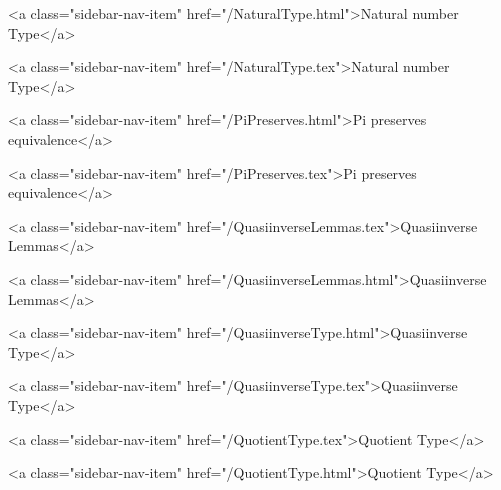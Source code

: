       
    
      
        
      
    
      
        
          <a class="sidebar-nav-item" href="/NaturalType.html">Natural number Type</a>
        
      
    
      
        
          <a class="sidebar-nav-item" href="/NaturalType.tex">Natural number Type</a>
        
      
    
      
        
          <a class="sidebar-nav-item" href="/PiPreserves.html">Pi preserves equivalence</a>
        
      
    
      
        
          <a class="sidebar-nav-item" href="/PiPreserves.tex">Pi preserves equivalence</a>
        
      
    
      
        
          <a class="sidebar-nav-item" href="/QuasiinverseLemmas.tex">Quasiinverse Lemmas</a>
        
      
    
      
        
          <a class="sidebar-nav-item" href="/QuasiinverseLemmas.html">Quasiinverse Lemmas</a>
        
      
    
      
        
          <a class="sidebar-nav-item" href="/QuasiinverseType.html">Quasiinverse Type</a>
        
      
    
      
        
          <a class="sidebar-nav-item" href="/QuasiinverseType.tex">Quasiinverse Type</a>
        
      
    
      
        
          <a class="sidebar-nav-item" href="/QuotientType.tex">Quotient Type</a>
        
      
    
      
        
          <a class="sidebar-nav-item" href="/QuotientType.html">Quotient Type</a>
        
      
    
